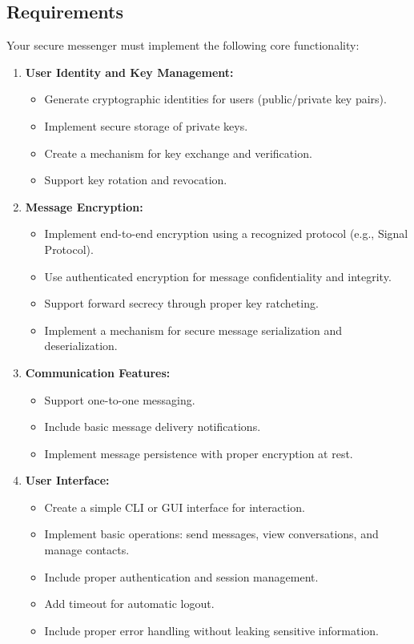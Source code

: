 \documentclass[10pt,a4paper,american]{exam}
\begin{document}
\subsection*{Requirements}
Your secure messenger must implement the following core functionality:

\begin{enumerate}
	\item \textbf{User Identity and Key Management:}
	      \begin{itemize}
		      \item Generate cryptographic identities for users (public/private key pairs).
		      \item Implement secure storage of private keys.
		      \item Create a mechanism for key exchange and verification.
		      \item Support key rotation and revocation.
	      \end{itemize}

	\item \textbf{Message Encryption:}
	      \begin{itemize}
		      \item Implement end-to-end encryption using a recognized protocol (e.g., Signal Protocol).
		      \item Use authenticated encryption for message confidentiality and integrity.
		      \item Support forward secrecy through proper key ratcheting.
		      \item Implement a mechanism for secure message serialization and deserialization.
	      \end{itemize}

	\item \textbf{Communication Features:}
	      \begin{itemize}
		      \item Support one-to-one messaging.
		      \item Include basic message delivery notifications.
		      \item Implement message persistence with proper encryption at rest.
	      \end{itemize}

	\item \textbf{User Interface:}
	      \begin{itemize}
		      \item Create a simple CLI or GUI interface for interaction.
		      \item Implement basic operations: send messages, view conversations, and manage contacts.
		      \item Include proper authentication and session management.
		      \item Add timeout for automatic logout.
		      \item Include proper error handling without leaking sensitive information.
	      \end{itemize}
\end{enumerate}
\end{document}
